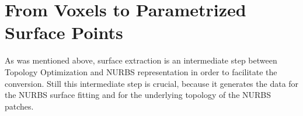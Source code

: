 \section{From Voxels to Parametrized Surface Points}
\label{sec:surfaceImpl}
As was mentioned above, surface extraction is an intermediate step between Topology Optimization and \ac{NURBS} representation in order to facilitate the conversion. Still this intermediate step is crucial, because it generates the data for the \ac{NURBS} surface fitting and for the underlying topology of the \ac{NURBS} patches.




